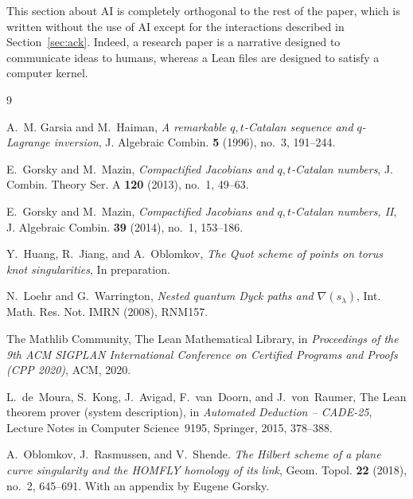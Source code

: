 \documentclass[11pt,reqno]{amsart}
\theoremstyle{remark}
\begin{document}
This section about AI is completely orthogonal to the rest of the paper, which is written without the use of AI except for the interactions described in Section~\ref{sec:ack}.
Indeed, a research paper is a narrative designed to communicate ideas to humans,
whereas a Lean files are designed to satisfy a computer kernel.

\begin{thebibliography}{9}

A.~M. Garsia and M.~Haiman,
\emph{A remarkable $q,t$-Catalan sequence and $q$-Lagrange inversion},
J. Algebraic Combin. \textbf{5} (1996), no.~3, 191--244.

E.~Gorsky and M.~Mazin,
\emph{Compactified Jacobians and $q,t$-Catalan numbers},
J. Combin. Theory Ser. A \textbf{120} (2013), no.~1, 49--63.

E.~Gorsky and M.~Mazin,
\emph{Compactified Jacobians and $q,t$-Catalan numbers, II},
J. Algebraic Combin. \textbf{39} (2014), no.~1, 153--186.

Y.~Huang, R.~Jiang, and A.~Oblomkov,
\emph{The Quot scheme of points on torus knot singularities},
In preparation.

N.~Loehr and G.~Warrington,
\emph{Nested quantum {D}yck paths and $\nabla(s_\lambda)$},
Int. Math. Res. Not. IMRN (2008), RNM157.

The {M}athlib Community,
The {L}ean Mathematical Library,
in \emph{Proceedings of the 9th ACM SIGPLAN International Conference on
Certified Programs and Proofs (CPP 2020)},
ACM, 2020.

L.~de~Moura, S.~Kong, J.~Avigad, F.~van~Doorn, and J.~von~Raumer,
The {L}ean theorem prover (system description),
in \emph{Automated Deduction -- CADE-25},
Lecture Notes in Computer Science~9195, Springer, 2015, 378--388.

A.~Oblomkov, J.~Rasmussen, and V.~Shende.
\emph{The {H}ilbert scheme of a plane curve singularity and the {HOMFLY} homology of its link},
Geom. Topol. \textbf{22} (2018), no.~2, 645--691.
With an appendix by Eugene Gorsky.

\end{thebibliography}
\end{document}
